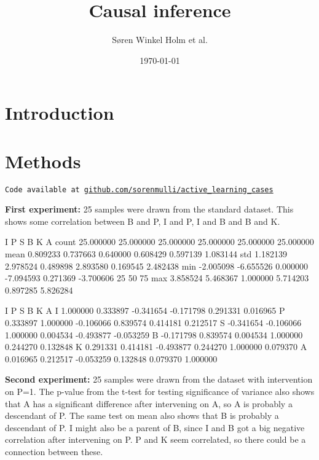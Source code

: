 \documentclass[12pt,fleqn,]{article}
\title{Causal inference }
\author{Søren Winkel Holm et al.}
\date{\today}
\begin{document}
\maketitle

\begin{abstract}

\end{abstract}

\begin{multicols}{2}
	
	
\section{Introduction} 
	
\section{Methods}
\texttt{Code available at \url{github.com/sorenmulli/active_learning_cases}} \newline

\textbf{First experiment:} 25 samples were drawn from the standard dataset. This shows some correlation between B and P, I and P, I and B and B and K.

            I          P          S          B          K          A
count  25.000000  25.000000  25.000000  25.000000  25.000000  25.000000
mean    0.809233   0.737663   0.640000   0.608429   0.597139   1.083144
std     1.182139   2.978524   0.489898   2.893580   0.169545   2.482438
min    -2.005098  -6.655526   0.000000  -7.094593   0.271369  -3.700606
25%
50%
75%
max     3.858524   5.468367   1.000000   5.714203   0.897285   5.826284

       I         P         S         B         K         A
I  1.000000  0.333897 -0.341654 -0.171798  0.291331  0.016965
P  0.333897  1.000000 -0.106066  0.839574  0.414181  0.212517
S -0.341654 -0.106066  1.000000  0.004534 -0.493877 -0.053259
B -0.171798  0.839574  0.004534  1.000000  0.244270  0.132848
K  0.291331  0.414181 -0.493877  0.244270  1.000000  0.079370
A  0.016965  0.212517 -0.053259  0.132848  0.079370  1.000000

\textbf{Second experiment:} 25 samples were drawn from the dataset with intervention on P=1. 
The p-value from the t-test for testing significance of variance also shows that A has a significant difference after intervening on A, so A is probably a descendant of P. 
The same test on mean also shows that B is probably a descendant of P. 
I might also be a parent of B, since I and B got a big negative correlation after intervening on P.
P and K seem correlated, so there could be a connection between these.


\end{multicols}
\end{document}
